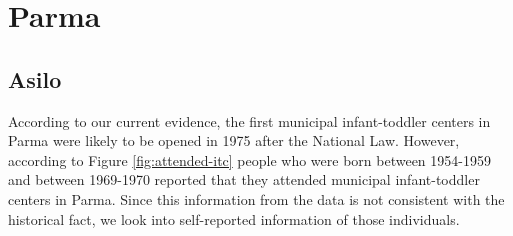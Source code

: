 \section{Parma}
\subsection{Asilo}

According to our current evidence, the first municipal infant-toddler centers in Parma were likely to be opened in 1975 after the National Law. However, according to Figure \ref{fig:attended-itc} people who were born between 1954-1959 and between 1969-1970 reported that they attended municipal infant-toddler centers in Parma. Since this information from the data is not consistent with the historical fact, we look into self-reported information of those individuals. 

